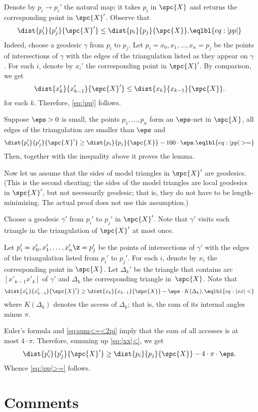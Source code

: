 Denote by $p_i\to p_i'$ the natural map; it takes $p_i$ in $\spc{X}$ and returns the corresponding point in $\spc{X}'$.
Observe that
\[\dist{p_i'}{p_j'}{\spc{X}'}
\le
\dist{p_i}{p_j}{\spc{X}}.\eqlbl{eq:|pp|}\]
Indeed, choose a geodesic $\gamma$ from $p_i$ to $p_j$.
Let $p_i=x_0,x_1,\dots,x_n=p_j$ be the points of intersections of $\gamma$ with the edges of the triangulation listed as they appear on $\gamma$.
For each $i$, denote by $x_i'$ the corresponding point in $\spc{X}'$.
By comparison, we get
\[\dist{x_k'}{x_{k-1}'}{\spc{X}'}
\le
\dist{x_k}{x_{k-1}}{\spc{X}}.\]
for each $k$.
Therefore, \ref{eq:|pp|} follows.

Suppose $\eps>0$ is small, the points $p_1,\dots,p_n$ form an $\eps$-net in $\spc{X}$, all edges of the triangulation are smaller than $\eps$ and
\[\dist{p_i'}{p_j'}{\spc{X}'}
\ge
\dist{p_i}{p_j}{\spc{X}} -100\cdot \eps.\eqlbl{eq:|pp|>=}\]
Then, together with the inequality above it proves the lemma.

Now let us assume that the sides of model triangles in $\spc{X}'$ are geodesics.
(This is the second cheating; the sides of the model triangles are local geodesics in $\spc{X}'$,
but not necessarily geodesic; that is, they do not have to be length-minimizing.
The actual proof does not use this assumption.)

Choose a geodesic $\gamma'$ from $p_i'$ to $p_j'$ in $\spc{X}'$.
Note that $\gamma'$ visits each triangle in the triangulation of $\spc{X}'$ at most once.

Let $p_i'=x_0',x_1',\dots,x_n'\z=p_j'$ be the points of intersections of $\gamma'$ with the edges of the triangulation listed from $p_i'$ to $p_j'$.
For each $i$, denote by $x_i$ the corresponding point in $\spc{X}$.
Let $\Delta_k'$ be the triangle that contains arc $[x'_{k-1}x'_k]$ of $\gamma'$ and $\Delta_k$ the corresponding triangle in~$\spc{X}$.
Note that
\[\dist{x_k'}{x_{k-1}'}{\spc{X}'}
\ge
\dist{x_k}{x_{k-1}}{\spc{X}} -\eps\cdot K(\Delta_k),
\eqlbl{eq:|xx|<}\]
where $K(\Delta_k)$ denotes the access of $\Delta_k$;
that is, the sum of its internal angles minus $\pi$.

Euler's formula and \ref{eq:sum<=<2pi} imply that the sum of all accesses is at most $4\cdot\pi$.
Therefore, summing up \ref{eq:|xx|<}, we get
\[\dist{p_i'}{p_j'}{\spc{X}'}
\ge
\dist{p_i}{p_j}{\spc{X}}-4\cdot \pi\cdot \eps.\]
Whence \ref{eq:|pp|>=} follows.
\qeds

\section{Comments}

